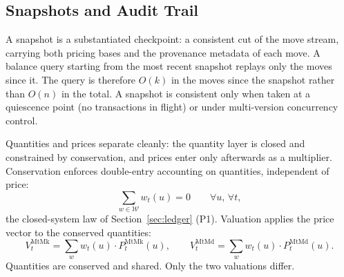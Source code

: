 \subsection{Snapshots and Audit Trail}
\label{subsec:snapshots}

A snapshot is a substantiated checkpoint: a consistent cut of the move stream, carrying both pricing bases and the provenance metadata of each move. A balance query starting from the most recent snapshot replays only the moves since it. The query is therefore $O(k)$ in the moves since the snapshot rather than $O(n)$ in the total. A snapshot is consistent only when taken at a quiescence point (no transactions in flight) or under multi-version concurrency control.

Quantities and prices separate cleanly: the quantity layer is closed and constrained by conservation, and prices enter only afterwards as a multiplier. Conservation enforces double-entry accounting on quantities, independent of price:
\[
\sum_{w\in\mathcal{W}} w_t(u) = 0 \qquad \forall u,\,\forall t,
\]
the closed-system law of Section~\ref{sec:ledger} (P1). Valuation applies the price vector to the conserved quantities:
\[
V_t^{\text{MtMk}} = \sum_{w} w_t(u)\cdot P_t^{\text{MtMk}}(u), \qquad
V_t^{\text{MtMd}} = \sum_{w} w_t(u)\cdot P_t^{\text{MtMd}}(u).
\]
Quantities are conserved and shared. Only the two valuations differ.

